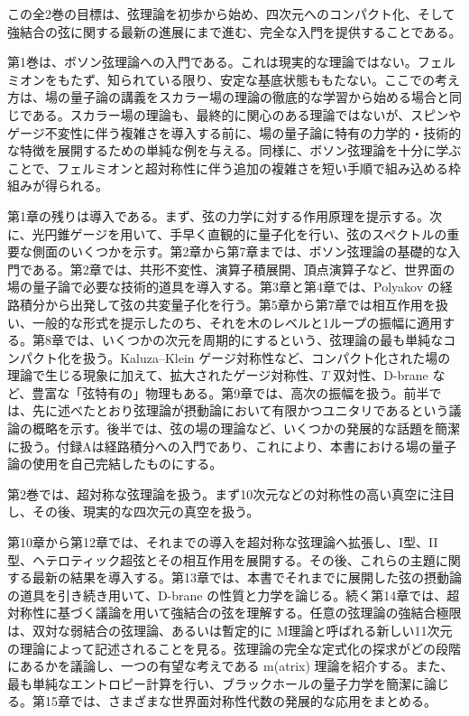 
この全2巻の目標は、弦理論を初歩から始め、四次元へのコンパクト化、そして強結合の弦に関する最新の進展にまで進む、完全な入門を提供することである。

第1巻は、ボソン弦理論への入門である。これは現実的な理論ではない。フェルミオンをもたず、知られている限り、安定な基底状態ももたない。ここでの考え方は、場の量子論の講義をスカラー場の理論の徹底的な学習から始める場合と同じである。スカラー場の理論も、最終的に関心のある理論ではないが、スピンやゲージ不変性に伴う複雑さを導入する前に、場の量子論に特有の力学的・技術的な特徴を展開するための単純な例を与える。同様に、ボソン弦理論を十分に学ぶことで、フェルミオンと超対称性に伴う追加の複雑さを短い手順で組み込める枠組みが得られる。

第1章の残りは導入である。まず、弦の力学に対する作用原理を提示する。次に、光円錐ゲージを用いて、手早く直観的に量子化を行い、弦のスペクトルの重要な側面のいくつかを示す。第2章から第7章までは、ボソン弦理論の基礎的な入門である。第2章では、共形不変性、演算子積展開、頂点演算子など、世界面の場の量子論で必要な技術的道具を導入する。第3章と第4章では、Polyakov の経路積分から出発して弦の共変量子化を行う。第5章から第7章では相互作用を扱い、一般的な形式を提示したのち、それを木のレベルと1ループの振幅に適用する。第8章では、いくつかの次元を周期的にするという、弦理論の最も単純なコンパクト化を扱う。Kaluza--Klein ゲージ対称性など、コンパクト化された場の理論で生じる現象に加えて、拡大されたゲージ対称性、$T$ 双対性、D-brane など、豊富な「弦特有の」物理もある。第9章では、高次の振幅を扱う。前半では、先に述べたとおり弦理論が摂動論において有限かつユニタリであるという議論の概略を示す。後半では、弦の場の理論など、いくつかの発展的な話題を簡潔に扱う。付録Aは経路積分への入門であり、これにより、本書における場の量子論の使用を自己完結したものにする。

第2巻では、超対称な弦理論を扱う。まず10次元などの対称性の高い真空に注目し、その後、現実的な四次元の真空を扱う。

第10章から第12章では、それまでの導入を超対称な弦理論へ拡張し、I型、II型、ヘテロティック超弦とその相互作用を展開する。その後、これらの主題に関する最新の結果を導入する。第13章では、本書でそれまでに展開した弦の摂動論の道具を引き続き用いて、D-brane の性質と力学を論じる。続く第14章では、超対称性に基づく議論を用いて強結合の弦を理解する。任意の弦理論の強結合極限は、双対な弱結合の弦理論、あるいは暫定的に M理論と呼ばれる新しい11次元の理論によって記述されることを見る。弦理論の完全な定式化の探求がどの段階にあるかを議論し、一つの有望な考えである m(atrix) 理論を紹介する。また、最も単純なエントロピー計算を行い、ブラックホールの量子力学を簡潔に論じる。第15章では、さまざまな世界面対称性代数の発展的な応用をまとめる。

